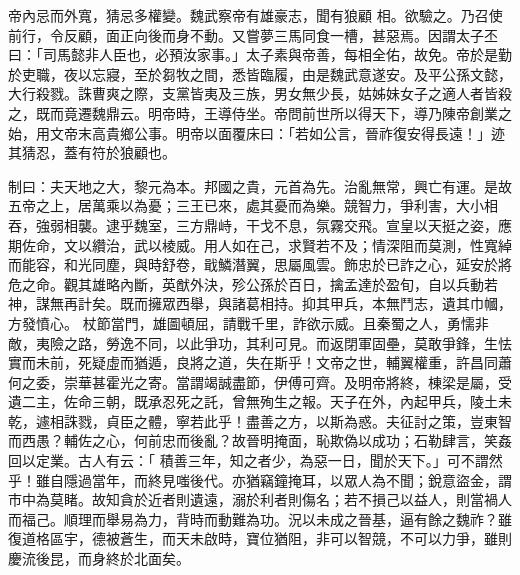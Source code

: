 \begin{pinyinscope}
 帝內忌而外寬，猜忌多權變。魏武察帝有雄豪志，聞有狼顧
 相。欲驗之。乃召使前行，令反顧，面正向後而身不動。又嘗夢三馬同食一槽，甚惡焉。因謂太子丕曰：「司馬懿非人臣也，必預汝家事。」太子素與帝善，每相全佑，故免。帝於是勤於吏職，夜以忘寢，至於芻牧之間，悉皆臨履，由是魏武意遂安。及平公孫文懿，大行殺戮。誅曹爽之際，支黨皆夷及三族，男女無少長，姑姊妹女子之適人者皆殺之，既而竟遷魏鼎云。明帝時，王導侍坐。帝問前世所以得天下，導乃陳帝創業之始，用文帝末高貴鄉公事。明帝以面覆床曰：「若如公言，晉祚復安得長遠！」迹其猜忍，蓋有符於狼顧也。



 制曰：夫天地之大，黎元為本。邦國之貴，元首為先。治亂無常，興亡有運。是故五帝之上，居萬乘以為憂；三王已來，處其憂而為樂。競智力，爭利害，大小相吞，強弱相襲。逮乎魏室，三方鼎峙，干戈不息，氛霧交飛。宣皇以天挺之姿，應期佐命，文以纘治，武以棱威。用人如在己，求賢若不及；情深阻而莫測，性寬綽而能容，和光同塵，與時舒卷，戢鱗潛翼，思屬風雲。飾忠於已詐之心，延安於將危之命。觀其雄略內斷，英猷外決，殄公孫於百日，擒孟達於盈旬，自以兵動若神，謀無再計矣。既而擁眾西舉，與諸葛相持。抑其甲兵，本無鬥志，遺其巾幗，方發憤心。
 杖節當門，雄圖頓屈，請戰千里，詐欲示威。且秦蜀之人，勇懦非敵，夷險之路，勞逸不同，以此爭功，其利可見。而返閉軍固壘，莫敢爭鋒，生怯實而未前，死疑虛而猶遁，良將之道，失在斯乎！文帝之世，輔翼權重，許昌同蕭何之委，崇華甚霍光之寄。當謂竭誠盡節，伊傅可齊。及明帝將終，棟梁是屬，受遺二主，佐命三朝，既承忍死之託，曾無殉生之報。天子在外，內起甲兵，陵土未乾，遽相誅戮，貞臣之體，寧若此乎！盡善之方，以斯為惑。夫征討之策，豈東智而西愚？輔佐之心，何前忠而後亂？故晉明掩面，恥欺偽以成功；石勒肆言，笑姦回以定業。古人有云：「
 積善三年，知之者少，為惡一日，聞於天下。」可不謂然乎！雖自隱過當年，而終見嗤後代。亦猶竊鐘掩耳，以眾人為不聞；銳意盜金，謂市中為莫睹。故知貪於近者則遺遠，溺於利者則傷名；若不損己以益人，則當禍人而福己。順理而舉易為力，背時而動難為功。況以未成之晉基，逼有餘之魏祚？雖復道格區宇，德被蒼生，而天未啟時，寶位猶阻，非可以智競，不可以力爭，雖則慶流後昆，而身終於北面矣。



\end{pinyinscope}